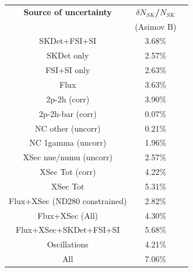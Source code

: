 \begin{table}[htb]
\centering
\begin{tabular}{| c | c | c |}
\hline
  {\bf Source of uncertainty}    & \multicolumn{1}{c|}{{\bf ${\delta}N_{SK}$/$N_{SK}$}}\\
                                 & \multicolumn{1}{c|}{(Asimov B)}\\

\hline
\hline  
SKDet+FSI+SI                   & 3.68\%                        \\
SKDet only                   & 2.57\%                        \\
FSI+SI only                   & 2.63\%                        \\
\hline
  Flux                           & 3.63\%                        \\
\hline
\hline
  2p-2h (corr)                     & 3.90\%                        \\
  2p-2h-bar (corr)                  & 0.07\%                        \\
  NC other (uncorr)              & 0.21\%                        \\
  NC 1gamma (uncorr)             & 1.96\%                        \\
  XSec nue/numu (uncorr)                 & 2.57\%                        \\
\hline
  XSec Tot (corr)                  & 4.22\%                        \\
  XSec Tot                       & 5.31\%                        \\
\hline
\hline
  Flux+XSec (ND280 constrained)                      & 2.82\%                        \\
  Flux+XSec (All)                      & 4.30\%                        \\
\hline
\hline
  Flux+XSec+SKDet+FSI+SI         & 5.68\%                        \\
\hline
\hline
  Oscillations                   & 4.21\%                        \\
\hline
\hline
  All                            & 7.06\%                        \\
\hline
\hline


\end{tabular}
\end{table}
